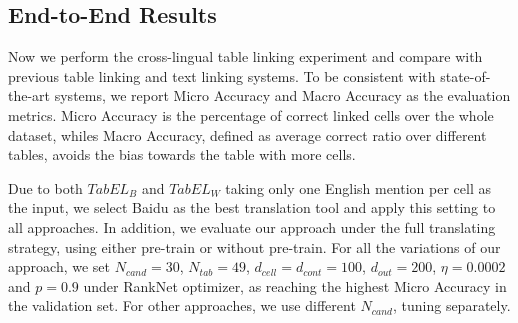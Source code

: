 \subsection{End-to-End Results}
\label{sec:exp-e2e-results}

Now we perform the cross-lingual table linking experiment and compare with
previous table linking and text linking systems.
To be consistent with state-of-the-art systems, we report Micro Accuracy
and Macro Accuracy as the evaluation metrics.
Micro Accuracy is the percentage of correct linked cells over the whole dataset,
whiles Macro Accuracy, defined as average correct ratio over different tables,
avoids the bias towards the table with more cells.


Due to both $TabEL_B$ and $TabEL_W$ taking only one English mention per cell as the input,
we select Baidu as the best translation tool and apply this setting to all approaches.
In addition, we evaluate our approach under the full translating strategy,
using either pre-train or without pre-train.
For all the variations of our approach,
we set $N_{cand}=30$, $N_{tab}=49$, $d_{cell}=d_{cont}=100$, $d_{out}=200$, $\eta=0.0002$ and $p=0.9$ under RankNet optimizer,
as reaching the highest Micro Accuracy in the validation set.
For other approaches, we use different $N_{cand}$, tuning separately.

